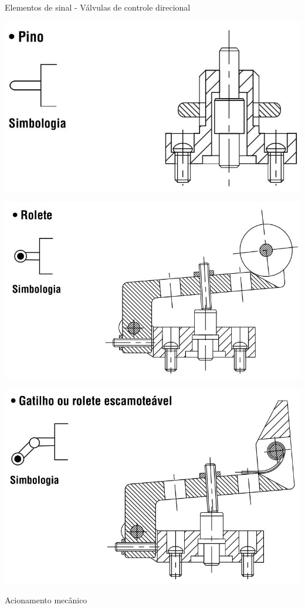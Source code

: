 \begin{frame}{Elementos de sinal - Válvulas de controle direcional}
	\begin{minipage}[c]{0.48\linewidth}
		\centering
		\includegraphics[width=1\linewidth]{Figuras/Ch14/fig12}
	\end{minipage}
	\hfill
	\begin{minipage}[c]{0.48\linewidth}
		\centering
		\includegraphics[width=1\linewidth]{Figuras/Ch14/fig13}
	\end{minipage}
	
	\centering
	\includegraphics[width=0.4\linewidth]{Figuras/Ch14/fig14}
	
	\medskip
	
	Acionamento mecânico
\end{frame}



